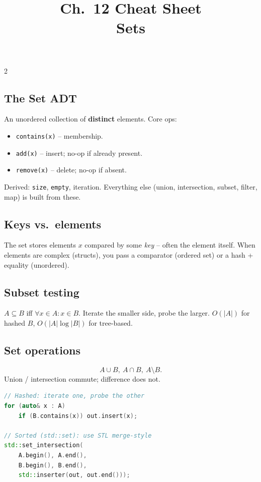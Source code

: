 \documentclass[10pt]{article}
\title{Ch.~12 Cheat Sheet\\\large Sets}
\author{}
\date{}
\begin{document}
\maketitle
\vspace{-2em}

\begin{multicols}{2}

\subsection*{The Set ADT}
An unordered collection of \textbf{distinct} elements. Core ops:
\begin{itemize}
    \item \texttt{contains(x)} -- membership.
    \item \texttt{add(x)} -- insert; no-op if already present.
    \item \texttt{remove(x)} -- delete; no-op if absent.
\end{itemize}
Derived: \texttt{size}, \texttt{empty}, iteration. Everything else
(union, intersection, subset, filter, map) is built from these.

\subsection*{Keys vs.\ elements}
The set stores elements $x$ compared by some \emph{key} -- often the
element itself. When elements are complex (structs), you pass a
comparator (ordered set) or a hash + equality (unordered).

\subsection*{Subset testing}
$A \subseteq B$ iff $\forall x \in A : x \in B$. Iterate the smaller
side, probe the larger. $O(|A|)$ for hashed $B$, $O(|A| \log |B|)$
for tree-based.

\subsection*{Set operations}
\[
A \cup B,\ A \cap B,\ A \setminus B.
\]
Union / intersection commute; difference does not.

\begin{lstlisting}[language=C++]
// Hashed: iterate one, probe the other
for (auto& x : A)
    if (B.contains(x)) out.insert(x);

// Sorted (std::set): use STL merge-style
std::set_intersection(
    A.begin(), A.end(),
    B.begin(), B.end(),
    std::inserter(out, out.end()));
\end{lstlisting}


\end{multicols}
\end{document}
